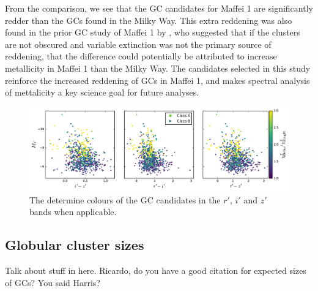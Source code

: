 \documentclass[useAMS,usenatbib]{mn2e}
\begin{document}
 From the comparison, we see that the GC candidates for Maffei 1 are significantly redder than the GCs found in the Milky Way. This extra reddening was also found in the prior GC study of Maffei 1 by \citet{buta03}, who suggested that if the clusters are not obscured and variable extinction was not the primary source of reddening, that the difference could potentially be attributed to increase metallicity in Maffei 1 than the Milky Way. The candidates selected in this study reinforce the increased reddening of GCs in Maffei 1, and makes spectral analysis of mettalicity a key science goal for future analyses.
 
 \begin{figure}
 	\includegraphics[width=\textwidth]{images/colour.pdf}
 	\caption{The determine colours of the GC candidates in the $r'$, $i'$ and $z'$ bands when applicable.}
 	\label{fig:colour}
 \end{figure}
 
 

\subsection{Globular cluster sizes}
\label{sec:gc_sizes}

{\color{red} Talk about stuff in here. Ricardo, do you have a good citation for expected sizes of GCs? You said Harris?}
\end{document}
